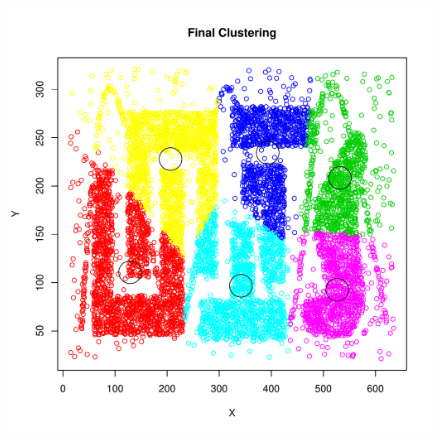 \documentclass{report}
\begin{document}
\begin{figure}[htp!]
  \centering
  \includegraphics[width=0.78\linewidth]{t4_8k}
\end{figure}
\end{document}

